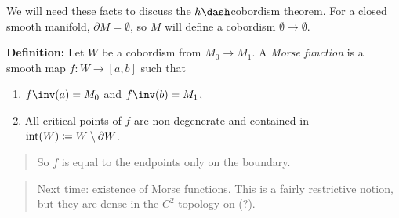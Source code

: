 We will need these facts to discuss the \(h\dash\)cobordism theorem. For
a closed smooth manifold, \(\partial M = \emptyset\), so \(M\) will define a
cobordism \(\emptyset \to \emptyset\).

\textbf{Definition:} Let \(W\) be a cobordism from \(M_0 \to M_1\). A
\emph{Morse function} is a smooth map \(f: W\to [a, b]\) such that

\begin{enumerate}
\def\labelenumi{\arabic{enumi}.}
\tightlist
\item
  \(f\inv(a) = M_0\) and \(f\inv(b) = M_1\),
\item
  All critical points of \(f\) are non-degenerate and contained in
  \(\mathrm{int}(W) \coloneqq W\setminus \partial W\).
\end{enumerate}

\begin{quote}
So \(f\) is equal to the endpoints only on the boundary.
\end{quote}

\begin{quote}
Next time: existence of Morse functions. This is a fairly restrictive
notion, but they are dense in the \(C^2\) topology on (?).
\end{quote}

